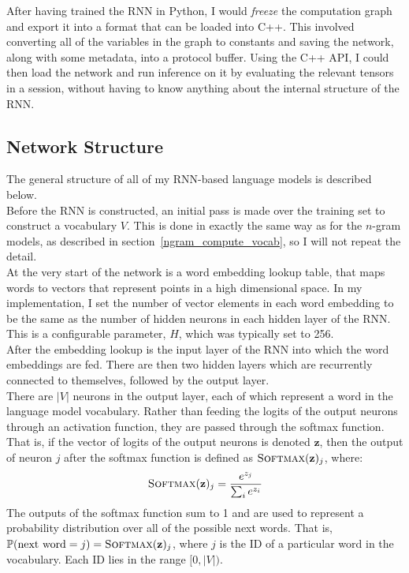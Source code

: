 \documentclass[a4paper, 12pt]{report}
\newcommand{\tit}[1]{\textit{#1}}
\begin{document}
After having trained the RNN in Python, I would \tit{freeze} the computation graph and export it into a format that can be loaded into C++. This involved converting all of the variables in the graph to constants and saving the network, along with some metadata, into a protocol buffer. Using the C++ API, I could then load the network and run inference on it by evaluating the relevant tensors in a session, without having to know anything about the internal structure of the RNN.

\subsection{Network Structure} \label{rnn_structure}

The general structure of all of my RNN-based language models is described below. \\

Before the RNN is constructed, an initial pass is made over the training set to construct a vocabulary $V$. This is done in exactly the same way as for the $n$-gram models, as described in section~\ref{ngram_compute_vocab}, so I will not repeat the detail. \\

At the very start of the network is a word embedding lookup table, that maps words to vectors that represent points in a high dimensional space. In my implementation, I set the number of vector elements in each word embedding to be the same as the number of hidden neurons in each hidden layer of the RNN. This is a configurable parameter, $H$, which was typically set to 256. \\

After the embedding lookup is the input layer of the RNN into which the word embeddings are fed. There are then two hidden layers which are recurrently connected to themselves, followed by the output layer. \\

There are $|V|$ neurons in the output layer, each of which represent a word in the language model vocabulary. Rather than feeding the logits of the output neurons through an activation function, they are passed through the softmax function. That is, if the vector of logits of the output neurons is denoted $\mathbf{z}$, then the output of neuron $j$ after the softmax function is defined as $\text{\scshape Softmax}(\mathbf{z})_j$, where:
\begin{gather}
	\text{\scshape Softmax}(\mathbf{z})_j = \frac{e^{z_j}}{\sum_i e^{z_i}}
\end{gather}
The outputs of the softmax function sum to 1 and are used to represent a probability distribution over all of the possible next words. That is, $\mathbb{P}(\text{next word} = j) = \text{\scshape Softmax}(\mathbf{z})_j$, where $j$ is the ID of a particular word in the vocabulary. Each ID lies in the range $[0, |V|)$.
\end{document}

